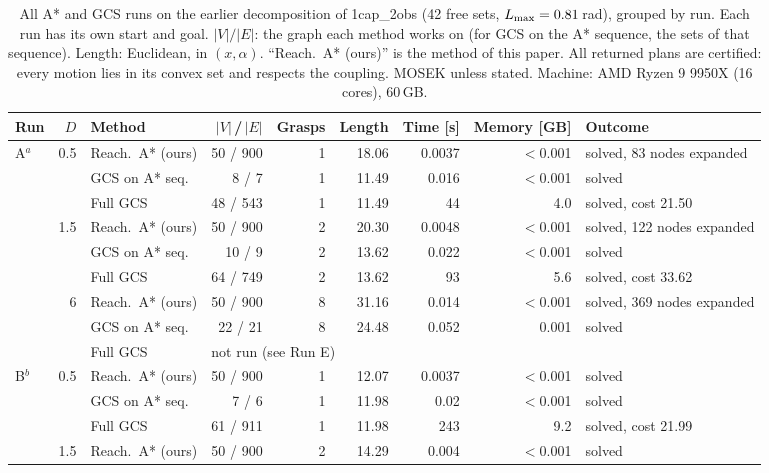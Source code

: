 \begin{table}[t]
\centering
\caption{All A* and GCS runs on the earlier decomposition of
\textsf{1cap\_2obs} (42 free sets, $L_{\max}=0.81$\,rad), grouped by run. Each run has its own start and goal.
$|V|/|E|$: the graph each method works on (for GCS on the A* sequence, the
sets of that sequence). Length: Euclidean, in $(x,\alpha)$. ``Reach.\ A* (ours)'' is the method of this paper. All returned plans
are certified: every motion lies in its convex set and respects the coupling.
MOSEK unless stated. Machine: AMD Ryzen 9 9950X (16 cores), 60\,GB.}
\label{tab:gcs:all}
\footnotesize
\setlength{\tabcolsep}{3.2pt}
\begin{tabular}{@{}l r l r r r r r l@{}}
\toprule
Run & $D$ & Method & $|V|$\,/\,$|E|$ & Grasps & Length & Time [s] & Memory [GB] & Outcome\\
\midrule
\multirow{9}{*}{A$^{a}$} & \multirow{3}{*}{0.5} & Reach.\ A* (ours) & 50 / 900 & 1 & 18.06 & 0.0037 & $<$0.001 & solved, 83 nodes expanded\\
 & & GCS on A* seq. & 8 / 7 & 1 & 11.49 & 0.016 & $<$0.001 & solved\\
 & & Full GCS & 48 / 543 & 1 & 11.49 & 44 & 4.0 & solved, cost 21.50\\
\cmidrule(l){2-9}
 & \multirow{3}{*}{1.5} & Reach.\ A* (ours) & 50 / 900 & 2 & 20.30 & 0.0048 & $<$0.001 & solved, 122 nodes expanded\\
 & & GCS on A* seq. & 10 / 9 & 2 & 13.62 & 0.022 & $<$0.001 & solved\\
 & & Full GCS & 64 / 749 & 2 & 13.62 & 93 & 5.6 & solved, cost 33.62\\
\cmidrule(l){2-9}
 & \multirow{3}{*}{6} & Reach.\ A* (ours) & 50 / 900 & 8 & 31.16 & 0.014 & $<$0.001 & solved, 369 nodes expanded\\
 & & GCS on A* seq. & 22 / 21 & 8 & 24.48 & 0.052 & 0.001 & solved\\
 & & Full GCS & \multicolumn{6}{l}{not run (see Run E)}\\
\midrule
\multirow{8}{*}{B$^{b}$} & \multirow{3}{*}{0.5} & Reach.\ A* (ours) & 50 / 900 & 1 & 12.07 & 0.0037 & $<$0.001 & solved\\
 & & GCS on A* seq. & 7 / 6 & 1 & 11.98 & 0.02 & $<$0.001 & solved\\
 & & Full GCS & 61 / 911 & 1 & 11.98 & 243 & 9.2 & solved, cost 21.99\\
\cmidrule(l){2-9}
 & \multirow{3}{*}{1.5} & Reach.\ A* (ours) & 50 / 900 & 2 & 14.29 & 0.004 & $<$0.001 & solved\\

\end{tabular}
\end{table}
